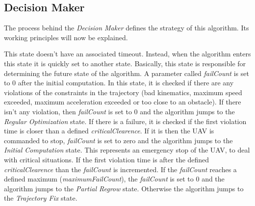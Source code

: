 \subsection{Decision Maker}
The process behind the \textit{Decision Maker} defines the strategy of this algorithm. Its working principles will now be explained.
\par
This state doesn't have an associated timeout. Instead, when the algorithm enters this state it is quickly set to another state. Basically, this state is responsible for determining the future state of the algorithm. A parameter called \textit{failCount} is set to 0 after the initial computation. In this state, it is checked if there are any violations of the constraints in the trajectory (bad kinematics, maximum speed exceeded, maximum acceleration exceeded or too close to an obstacle). If there isn't any violation, then \textit{failCount} is set to 0 and the algorithm jumps to the \textit{Regular Optimization} state. If there is a failure, it is checked if the first violation time is closer than a defined \textit{criticalClearence}. If it is then the UAV is commanded to stop, \textit{failCount} is set to zero and the algorithm jumps to the \textit{Initial Computation} state. This represents an emergency stop of the UAV, to deal with critical situations. If the first violation time is after the defined \textit{criticalClearence} than the \textit{failCount} is incremented. If the \textit{failCount} reaches a defined maximum (\textit{maximumFailCount}), the \textit{failCount} is set to 0 and the algorithm jumps to the \textit{Partial Regrow} state. Otherwise the algorithm jumps to the \textit{Trajectory Fix} state.